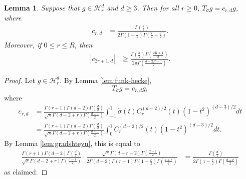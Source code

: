 \documentclass{article}
\newtheorem{lemma}[theorem]{Lemma}
\theoremstyle{definition}
\newcommand{\mc}{\mathcal}
\begin{document}
\begin{lemma}\label{lemma:eigendecomposition-sign}
    Suppose that $g \in \mc{H}_r^d$ and $d \geq 3$. Then for all $r \geq 0$, $T_{\dot{\sigma}}g = c_{r,d}g$, where
    \begin{align*}
        c_{r,d} &= \frac{\Gamma\left(\frac{d}{2}\right)}{2\Gamma\left(1 - \frac{r}{2}\right)\Gamma\left(\frac{r}{2} + \frac{d}{2}\right)  }.
    \end{align*}
    Moreover, if $0 \leq r \leq R$, then
    \begin{align*}
        |c_{2r + 1, d}| &\geq  \frac{\Gamma\left(\frac{d}{2}\right)\Gamma\left(\frac{2R + 1}{2}\right) }{2\pi \Gamma\left(\frac{d + 2R + 1}{2}\right) }.
    \end{align*}
\end{lemma}
\begin{proof}
    Let $g \in \mc{H}_r^d$. By Lemma \ref{lem:funk-hecke},
    \[T_{\dot{\sigma}} g = c_{r, d}g, \]
    where
    \begin{align*}
        c_{r,d} &= \frac{\Gamma(r + 1)\Gamma(d - 2)\Gamma\left(\frac{d}{2}\right)  }{\sqrt{\pi}\Gamma(d - 2 + r)\Gamma\left(\frac{d - 1}{2}\right) } \int_{-1}^1 \dot{\sigma}(t) C_r^{(d - 2)/2}(t)(1 - t^2)^{(d - 3)/2}dt\\
        &= \frac{\Gamma(r + 1)\Gamma(d - 2)\Gamma\left(\frac{d}{2}\right)  }{\sqrt{\pi}\Gamma(d - 2 + r)\Gamma\left(\frac{d - 1}{2}\right) } \int_{0}^1 C_r^{(d - 2)/2}(t)(1 - t^2)^{(d - 3)/2}dt.
    \end{align*}
    By Lemma \ref{lem:gradshteyn}, this is equal to
    \begin{align*}
        \frac{\Gamma(r + 1)\Gamma(d - 2)\Gamma\left(\frac{d}{2}\right)  }{\sqrt{\pi}\Gamma(d - 2 + r)\Gamma\left(\frac{d - 1}{2}\right) } \cdot \frac{\sqrt{\pi}\Gamma(d + r - 2)\Gamma\left(\frac{d - 1}{2}\right) }{2\Gamma(d - 2)\Gamma(r + 1)\Gamma\left(1 - \frac{r}{2}\right)\Gamma\left(\frac{d + r}{2}\right)  } &= \frac{\Gamma\left(\frac{d}{2}\right) }{2\Gamma\left(1 - \frac{r}{2}\right)\Gamma\left(\frac{d + r}{2}\right) }
    \end{align*}
    as claimed.


\end{proof}
\end{document}
